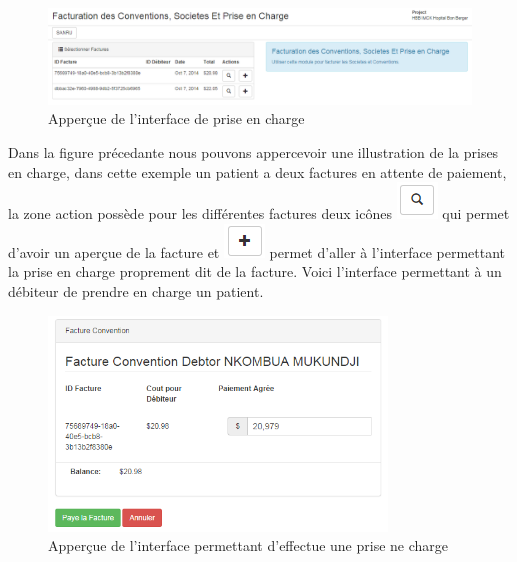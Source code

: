\documentclass[12pt,a4paper]{report}
\begin{document}
\begin{figure}[h]
\begin{center}
\includegraphics[width=14cm]{pic/FactPrCharge.png}
\end{center}
\caption{Apperçue de l'interface de prise en charge}
\label{Apperçue de l'interface de prise en charge}
\end{figure}

Dans la figure précedante nous pouvons appercevoir une illustration de la prises en charge, dans cette exemple un patient a deux factures en attente de paiement, la zone action possède pour les différentes factures deux icônes \includegraphics[scale=0.7]{pic/LoopBlack.png} qui permet d'avoir un aperçue de la facture et \includegraphics[scale=0.7]{pic/plusBlack.png} permet d'aller à l'interface permettant la prise en charge proprement dit de la facture. 
Voici l'interface permettant à un débiteur de prendre en charge un patient.

\begin{figure}[h]
\begin{center}
\includegraphics[width=9cm]{pic/FactConv1.png}
\end{center}
\caption{Apperçue de l'interface permettant d'effectue une prise ne charge}
\label{Apperçue de l'interface permettant d'effectue une prise ne charge}
\end{figure}
\end{document}
